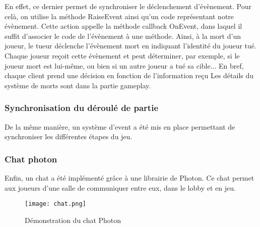         En effet, ce dernier permet de synchroniser le déclenchement d'évènement. Pour celà, on utilise la méthode RaiseEvent ainsi
        qu'un code représentant notre évènement. Cette action appelle la méthode callback OnEvent, dans laquel il suffit d'associer le
        code de l'évènement à une méthode. Ainsi, à la mort d'un joueur, le tueur déclenche l'évènement mort en indiquant l'identité du
        joueur tué. Chaque joueur reçoit cette évènement et peut déterminer, par exemple, si le joueur mort est lui-même, ou bien si un
        autre joueur a tué sa cible... En bref, chaque client prend une décision en fonction de l'information reçu
        Les détails du système de morts sont dans la partie gameplay.

    \subsubsection{Synchronisation du déroulé de partie}
        De la même manière, un système d'event a été mis en place permettant de synchroniser les différentes étapes du jeu.

    \subsubsection{Chat photon}
	Enfin, un chat a été implémenté grâce à une librairie de Photon. Ce chat permet aux joueurs 
	d'une salle de communiquer entre eux, dans le lobby et en jeu.

	\begin{figure}[hbt!]
		\centering
		\texttt{[image: chat.png]}
		\caption{Démonstration du chat Photon}
	\end{figure}


